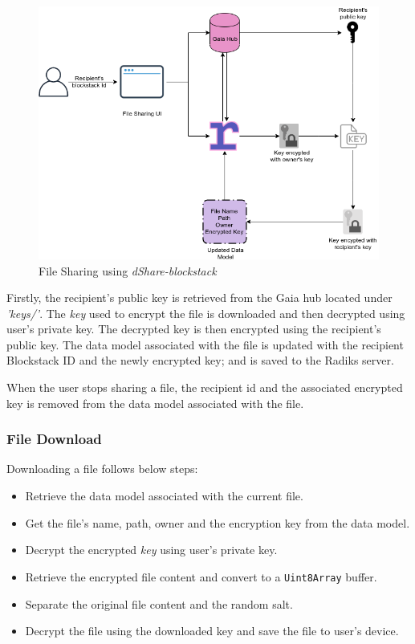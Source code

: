 				\begin{figure}[h]
					\includegraphics[width=\linewidth]{figures/blockstack-share}
					\caption{\label{fig:blockstack-share} File Sharing using \textit{dShare-blockstack}}
				\end{figure}
			
				Firstly, the recipient's public key is retrieved from the Gaia hub located under \textit{'keys/'}. The \textit{key} used to encrypt the file is downloaded and then decrypted using user's private key. The decrypted key is then encrypted using the recipient's public key. The data model associated with the file is updated with the recipient Blockstack ID and the newly encrypted key; and is saved to the Radiks server. 
				
				When the user stops sharing a file, the recipient id and the associated encrypted key is removed from the data model associated with the file.
			
			\subsubsection{File Download}
				Downloading a file follows below steps:
				
				\begin{itemize}
					\item Retrieve the data model associated with the current file.
					\item Get the file's name, path, owner and the encryption key from the data model.
					\item Decrypt the encrypted \textit{key} using user's private key.
					\item Retrieve the encrypted file content and convert to a \texttt{Uint8Array} buffer.
					\item Separate the original file content and the random salt.
					\item Decrypt the file using the downloaded key and save the file to user's device.
				\end{itemize}
			
